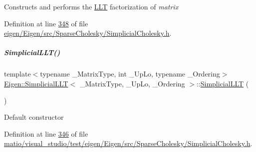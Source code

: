 Constructs and performs the \hyperlink{group___cholesky___module_class_eigen_1_1_l_l_t}{L\+LT} factorization of {\itshape matrix} 

Definition at line \hyperlink{eigen_2_eigen_2src_2_sparse_cholesky_2_simplicial_cholesky_8h_source_l00348}{348} of file \hyperlink{eigen_2_eigen_2src_2_sparse_cholesky_2_simplicial_cholesky_8h_source}{eigen/\+Eigen/src/\+Sparse\+Cholesky/\+Simplicial\+Cholesky.\+h}.

\mbox{\label{group___sparse_cholesky___module_ad25633e34d7c21b77fe05c873ffbe416}} 
\subparagraph{\texorpdfstring{Simplicial\+L\+L\+T()}{SimplicialLLT()}\hspace{0.1cm}{\footnotesize\ttfamily [3/4]}}
{\footnotesize\ttfamily template$<$typename \+\_\+\+Matrix\+Type, int \+\_\+\+Up\+Lo, typename \+\_\+\+Ordering$>$ \\
\hyperlink{group___sparse_cholesky___module_class_eigen_1_1_simplicial_l_l_t}{Eigen\+::\+Simplicial\+L\+LT}$<$ \+\_\+\+Matrix\+Type, \+\_\+\+Up\+Lo, \+\_\+\+Ordering $>$\+::\hyperlink{group___sparse_cholesky___module_class_eigen_1_1_simplicial_l_l_t}{Simplicial\+L\+LT} (\begin{DoxyParamCaption}{ }\end{DoxyParamCaption})\hspace{0.3cm}{\ttfamily [inline]}}

Default constructor 

Definition at line \hyperlink{matio_2visual__studio_2test_2eigen_2_eigen_2src_2_sparse_cholesky_2_simplicial_cholesky_8h_source_l00346}{346} of file \hyperlink{matio_2visual__studio_2test_2eigen_2_eigen_2src_2_sparse_cholesky_2_simplicial_cholesky_8h_source}{matio/visual\+\_\+studio/test/eigen/\+Eigen/src/\+Sparse\+Cholesky/\+Simplicial\+Cholesky.\+h}.

